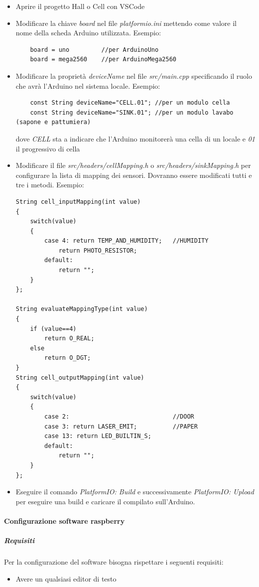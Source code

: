 \documentclass[12pt]{article}
\begin{document}
\begin{itemize}
\item Aprire il progetto Hall o Cell con VSCode
\item Modificare la chiave \textit{board} nel file \textit{platformio.ini} mettendo come valore il nome della scheda Arduino utilizzata. Esempio:
\begin{lstlisting}
	board = uno 		//per ArduinoUno
	board = mega2560 	//per ArduinoMega2560
\end{lstlisting}
\item Modificare la proprietà \textit{deviceName} nel file \textit{src/main.cpp} specificando il ruolo che avrà l'Arduino nel sistema locale. Esempio:
\begin{lstlisting}
	const String deviceName="CELL.01"; //per un modulo cella
	const String deviceName="SINK.01"; //per un modulo lavabo (sapone e pattumiera)
\end{lstlisting}
dove \textit{CELL} sta a indicare che l'Arduino monitorerà una cella di un locale e \textit{01} il progressivo di cella

\item Modificare il file \textit{src/headers/cellMapping.h} o \textit{src/headers/sinkMapping.h} per configurare la lista di mapping dei sensori. Dovranno essere modificati tutti e tre i metodi. Esempio:
\begin{lstlisting}
String cell_inputMapping(int value)
{
    switch(value)
    {
        case 4: return TEMP_AND_HUMIDITY;   //HUMIDITY
            return PHOTO_RESISTOR;
        default:
            return "";
    }
};

String evaluateMappingType(int value)
{
	if (value==4)
		return O_REAL;
	else
		return O_DGT;
}
String cell_outputMapping(int value)
{
    switch(value)
    {
        case 2:                             //DOOR
        case 3: return LASER_EMIT;          //PAPER
        case 13: return LED_BUILTIN_S;
        default:
            return "";
    }
};
\end{lstlisting}

\item Eseguire il comando \textit{PlatformIO: Build} e successivamente \textit{PlatformIO: Upload} per eseguire una build e caricare il compilato sull'Arduino.

\end{itemize}

\newpage

\paragraph{Configurazione software raspberry}
\subparagraph{Requisiti}
Per la configurazione del software bisogna rispettare i seguenti requisiti:
\begin{itemize}
\item Avere un qualsiasi editor di testo
\end{itemize}
\end{document}
